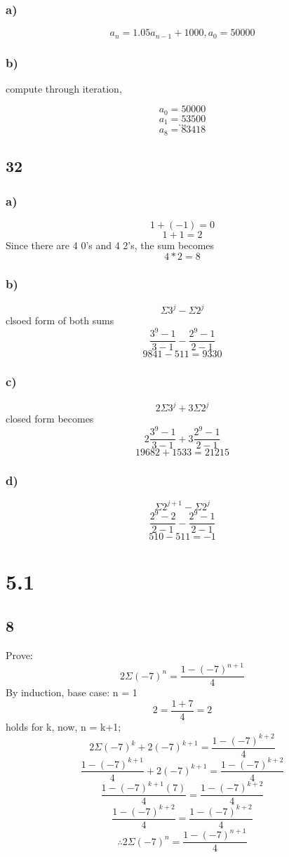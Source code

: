 \documentclass[journal]{IEEEtran}
\begin{document}
\subsubsection*{a)}
$$\boxed{a_n = 1.05a_{n-1} + 1000, a_0 = 50000}$$


\subsubsection*{b)}
compute through iteration,

$$a_0 = 50000$$
$$a_1 = 53500$$
$$...$$
$$a_8 = 83418$$


\subsection*{32}
\subsubsection*{a)}
$$1 + (-1) = 0$$
$$1 + 1 = 2$$
Since there are 4 0's and 4 2's, the sum becomes
$$4*2 = \boxed{8}$$

\subsubsection*{b)}
$$\Sigma 3^j - \Sigma 2^j$$
clsoed form of both sums
$$\frac{3^9 - 1}{3-1} - \frac{2^9 - 1}{2-1}$$
$$9841 - 511 = \boxed{9330}$$

\subsubsection*{c)}
$$2 \Sigma 3^j + 3 \Sigma 2^j$$
closed form becomes 
$$2 \frac{3^9 - 1}{3-1} + 3 \frac{2^9 - 1}{2-1}$$
$$19682 + 1533 = \boxed{21215}$$

\subsubsection*{d)}
$$\Sigma 2^{j+1} - \Sigma 2^j$$
$$\frac{2^9 - 2}{2-1} - \frac{2^9 - 1}{2-1}$$
$$510 - 511 = \boxed{-1}$$

\section*{5.1}
\subsection*{8}
Prove:
$$2 \Sigma (-7)^n = \frac{1-(-7)^{n+1}}{4}$$
By induction, base case: n = 1
$$2 = \frac{1 + 7}{4} = 2$$
holds for k, now, n = k+1;
$$2 \Sigma (-7)^k + 2(-7)^{k+1} = \frac{1-(-7)^{k+2}}{4}$$
$$\frac{1-(-7)^{k+1}}{4} + 2(-7)^{k+1} = \frac{1-(-7)^{k+2}}{4}$$
$$\frac{1-(-7)^{k+1}(7)}{4} = \frac{1-(-7)^{k+2}}{4}$$
$$\frac{1-(-7)^{k+2}}{4} = \frac{1-(-7)^{k+2}}{4}$$
$$\boxed{\therefore 2 \Sigma (-7)^n = \frac{1-(-7)^{n+1}}{4}}$$
\end{document}
